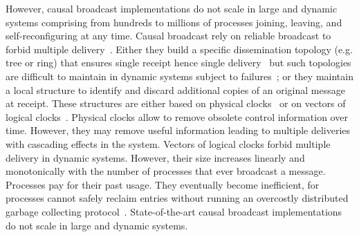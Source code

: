 However, causal broadcast implementations do not scale in large and dynamic
systems comprising from hundreds to millions of processes joining, leaving, and
self-reconfiguring at any time.
%
Causal broadcast rely on reliable broadcast to forbid multiple
delivery~\cite{hadzilacos1994modular}. %
Either they build a specific dissemination topology (e.g. tree or ring) that
ensures single receipt hence single
delivery~\cite{bravo2017saturn,raynal2013distributed} but such topologies are
difficult to maintain in dynamic systems subject to
failures~\cite{krasikova2016hashtable}; or they maintain a local structure to
identify and discard additional copies of an original message at receipt. These
structures are either based on physical
clocks~\cite{cachin2011introduction,demers1987epidemic} or on vectors of logical
clocks~\cite{malkhi2007concise,mukund2014optimized}. Physical clocks allow to
remove obsolete control information over time. However, they may remove useful
information leading to multiple deliveries with cascading effects in the
system. Vectors of logical clocks forbid multiple delivery in dynamic
systems. However, their size increases linearly and monotonically with the
number of processes that ever broadcast a message. Processes pay for their past
usage. They eventually become inefficient, for processes cannot safely reclaim
entries without running an overcostly distributed garbage collecting
protocol~\cite{abdullahi1998garbage}. State-of-the-art causal broadcast
implementations do not scale in large and dynamic systems.


